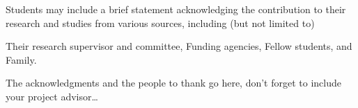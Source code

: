 
\begin{acknowledgements}

Students may include a brief statement acknowledging the contribution to their research and studies from various sources, including (but not limited  to)

Their research supervisor and committee,
Funding agencies,
Fellow students, and
Family.

The acknowledgments and the people to thank go here, don't forget to include your project advisor\ldots

\end{acknowledgements}